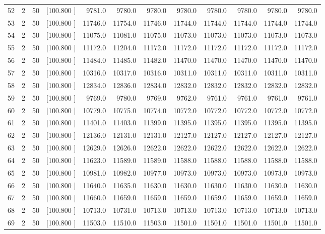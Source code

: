 \documentclass[12pt,a4paper]{article}
\begin{document}
\begin{center}
{\begin{tabular}{r r r r r r r r r r r r}
  52&  2& 50&[100.800   ]&  9781.0&  9780.0&  9780.0&  9780.0&  9780.0&  9780.0&  9780.0&  9780.0\\[-0.02in]
  53&  2& 50&[100.800   ]& 11746.0& 11754.0& 11746.0& 11744.0& 11744.0& 11744.0& 11744.0& 11744.0\\[-0.02in]
  54&  2& 50&[100.800   ]& 11075.0& 11081.0& 11075.0& 11073.0& 11073.0& 11073.0& 11073.0& 11073.0\\[-0.02in]
  55&  2& 50&[100.800   ]& 11172.0& 11204.0& 11172.0& 11172.0& 11172.0& 11172.0& 11172.0& 11172.0\\[-0.02in]
  56&  2& 50&[100.800   ]& 11484.0& 11485.0& 11482.0& 11470.0& 11470.0& 11470.0& 11470.0& 11470.0\\[-0.02in]
  57&  2& 50&[100.800   ]& 10316.0& 10317.0& 10316.0& 10311.0& 10311.0& 10311.0& 10311.0& 10311.0\\[-0.02in]
  58&  2& 50&[100.800   ]& 12834.0& 12836.0& 12834.0& 12832.0& 12832.0& 12832.0& 12832.0& 12832.0\\[-0.02in]
  59&  2& 50&[100.800   ]&  9769.0&  9780.0&  9769.0&  9762.0&  9761.0&  9761.0&  9761.0&  9761.0\\[-0.02in]
  60&  2& 50&[100.800   ]& 10779.0& 10775.0& 10774.0& 10772.0& 10772.0& 10772.0& 10772.0& 10772.0\\[-0.02in]
  61&  2& 50&[100.800   ]& 11401.0& 11403.0& 11399.0& 11395.0& 11395.0& 11395.0& 11395.0& 11395.0\\[-0.02in]
  62&  2& 50&[100.800   ]& 12136.0& 12131.0& 12131.0& 12127.0& 12127.0& 12127.0& 12127.0& 12127.0\\[-0.02in]
  63&  2& 50&[100.800   ]& 12629.0& 12626.0& 12622.0& 12622.0& 12622.0& 12622.0& 12622.0& 12622.0\\[-0.02in]
  64&  2& 50&[100.800   ]& 11623.0& 11589.0& 11589.0& 11588.0& 11588.0& 11588.0& 11588.0& 11588.0\\[-0.02in]
  65&  2& 50&[100.800   ]& 10981.0& 10982.0& 10977.0& 10973.0& 10973.0& 10973.0& 10973.0& 10973.0\\[-0.02in]
  66&  2& 50&[100.800   ]& 11640.0& 11635.0& 11630.0& 11630.0& 11630.0& 11630.0& 11630.0& 11630.0\\[-0.02in]
  67&  2& 50&[100.800   ]& 11660.0& 11659.0& 11659.0& 11659.0& 11659.0& 11659.0& 11659.0& 11659.0\\[-0.02in]
  68&  2& 50&[100.800   ]& 10713.0& 10731.0& 10713.0& 10713.0& 10713.0& 10713.0& 10713.0& 10713.0\\[-0.02in]
  69&  2& 50&[100.800   ]& 11503.0& 11510.0& 11503.0& 11501.0& 11501.0& 11501.0& 11501.0& 11501.0\\[-0.02in]

\end{tabular}}
\end{center}
\end{document}
